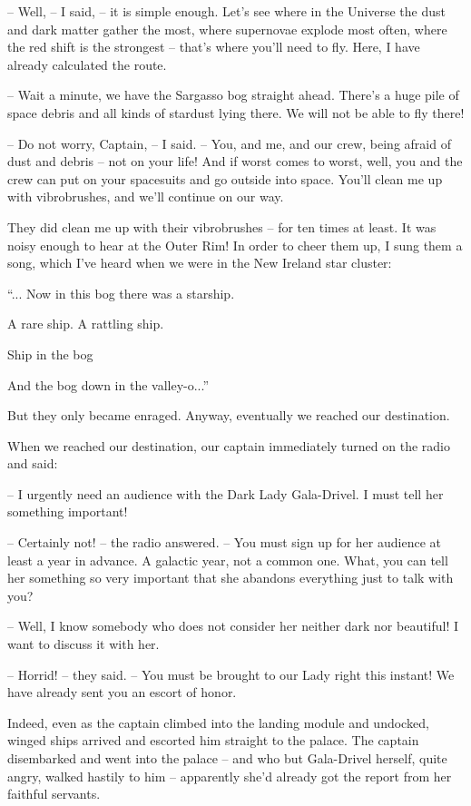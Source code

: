 \documentclass[ebook,oneside,final,openright]{memoir}
\begin{document}
– Well, – I said, – it is simple enough. Let’s see where in the Universe the dust and dark matter gather the most, where supernovae explode most often, where the red shift is the strongest – that’s where you’ll need to fly. Here, I have already calculated the route.\par
– Wait a minute, we have the Sargasso bog straight ahead. There’s a huge pile of space debris and all kinds of stardust lying there. We will not be able to fly there!\par
– Do not worry, Captain, – I said. – You, and me, and our crew, being afraid of dust and debris – not on your life! And if worst comes to worst, well, you and the crew can put on your spacesuits and go outside into space. You’ll clean me up with vibrobrushes, and we’ll continue on our way.\par
\par
They did clean me up with their vibrobrushes – for ten times at least. It was noisy enough to hear at the Outer Rim! In order to cheer them up, I sung them a song, which I’ve heard when we were in the New Ireland star cluster: \par
“... Now in this bog there was a starship.\par
A rare ship. A rattling ship.\par
Ship in the bog\par
And the bog down in the valley-o...”\par
 But they only became enraged. Anyway, eventually we reached our destination.\par
\par
When we reached our destination, our captain immediately turned on the radio and said:\par
– I urgently need an audience with the Dark Lady Gala-Drivel. I must tell her something important! \par
– Certainly not! – the radio answered. – You must sign up for her audience at least a year in advance. A galactic year, not a common one. What, you can tell her something so very important that she abandons everything just to talk with you?\par
– Well, I know somebody who does not consider her neither dark nor beautiful! I want to discuss it with her.\par
– Horrid! – they said. – You must be brought to our Lady right this instant! We have already sent you an escort of honor.\par
\par
Indeed, even as the captain climbed into the landing module and undocked, winged ships arrived and escorted him straight to the palace. The captain disembarked and went into the palace – and who but Gala-Drivel herself, quite angry, walked hastily to him – apparently she’d already got the report from her faithful servants.\par
\end{document}

